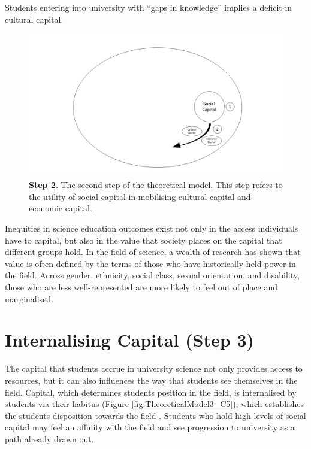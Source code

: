 Students entering into university with ``gaps in knowledge'' implies a deficit in cultural capital.  
\begin{figure}[ht]
\centering
\includegraphics[width=\textwidth]{C5 - Understanding Capital Accumulation/HabitusSocCap_TheoreticalModel2.png}
\caption{\label{fig:TheoreticalModel2_C5}\textbf{Step 2}. The second step of the theoretical model. This step refers to the utility of social capital in mobilising cultural capital and economic capital.}
\end{figure}

Inequities in science education outcomes exist not only in the access individuals have to capital, but also in the value that society places on the capital that different groups hold. In the field of science, a wealth of research has shown that value is often defined by the terms of those who have historically held power in the field. Across gender, ethnicity, social class, sexual orientation, and disability, those who are less well-represented are more likely to feel out of place and marginalised. 


\section{Internalising Capital (Step 3)}
The capital that students accrue in university science not only provides access to resources, but it can also influences the way that students see themselves in the field. Capital, which determines students position in the field, is internalised by students via their habitus  (Figure \ref{fig:TheoreticalModel3_C5}), which establishes the students disposition towards the field \cite{Bourdieu1992}. Students who hold high levels of social capital may feel an affinity with the field and see progression to university as a path already drawn out.

